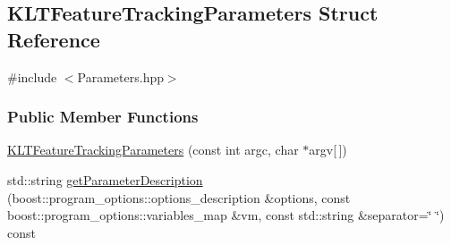 \hypertarget{structKLTFeatureTrackingParameters}{\subsection{K\-L\-T\-Feature\-Tracking\-Parameters Struct Reference}
\label{structKLTFeatureTrackingParameters}
}


{\ttfamily \#include $<$Parameters.\-hpp$>$}

\subsubsection*{Public Member Functions}
\begin{DoxyCompactItemize}
\item 
\hyperlink{structKLTFeatureTrackingParameters_afb176376d930d5aad8064535835830ec}{K\-L\-T\-Feature\-Tracking\-Parameters} (const int argc, char $\ast$argv\mbox{[}$\,$\mbox{]})
\item 
std\-::string \hyperlink{structKLTFeatureTrackingParameters_a2debf68a0b959e1e02316f905c7e0a79}{get\-Parameter\-Description} (boost\-::program\-\_\-options\-::options\-\_\-description \&options, const boost\-::program\-\_\-options\-::variables\-\_\-map \&vm, const std\-::string \&separator=\char`\"{} \char`\"{}) const 
\end{DoxyCompactItemize}
